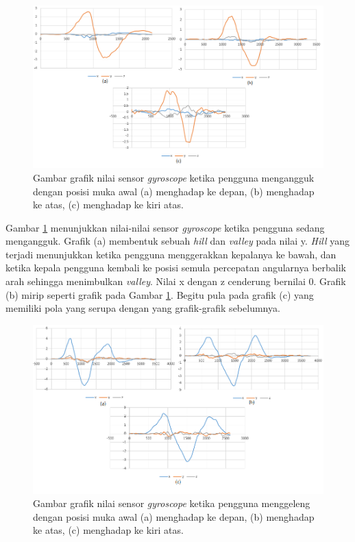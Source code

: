 \begin{figure}[htbp]
\centering
\includegraphics[scale=0.6]{Gambar/grafik-sensor-gyroscope-mengangguk.png}
\caption{Gambar grafik nilai sensor \textit{gyroscope} ketika pengguna mengangguk dengan posisi muka awal (a) menghadap ke depan, (b) menghadap ke atas, (c) menghadap ke kiri atas.}
\label{fig:grafik-sensor-gyroscope-mengangguk}
\end{figure}
Gambar \ref{fig:grafik-sensor-gyroscope-mengangguk} menunjukkan nilai-nilai sensor \textit{gyroscope} ketika pengguna sedang mengangguk. Grafik (a) membentuk sebuah \textit{hill} dan \textit{valley} pada nilai y. \textit{Hill} yang terjadi menunjukkan ketika pengguna menggerakkan kepalanya ke bawah, dan ketika kepala pengguna kembali ke posisi semula percepatan angularnya berbalik arah sehingga menimbulkan \textit{valley}. Nilai x dengan z cenderung bernilai 0. Grafik (b) mirip seperti grafik pada Gambar \ref{fig:grafik-sensor-gyroscope-mengangguk}. Begitu pula pada grafik (c) yang memiliki pola yang serupa dengan yang grafik-grafik sebelumnya.

\begin{figure}[htbp]
\centering
\includegraphics[scale=0.6]{Gambar/grafik-sensor-gyroscope-menggeleng.png}
\caption{Gambar grafik nilai sensor \textit{gyroscope} ketika pengguna menggeleng dengan posisi muka awal (a) menghadap ke depan, (b) menghadap ke atas, (c) menghadap ke kiri atas.} 
\label{fig:grafik-sensor-gyroscope-menggeleng}
\end{figure}

